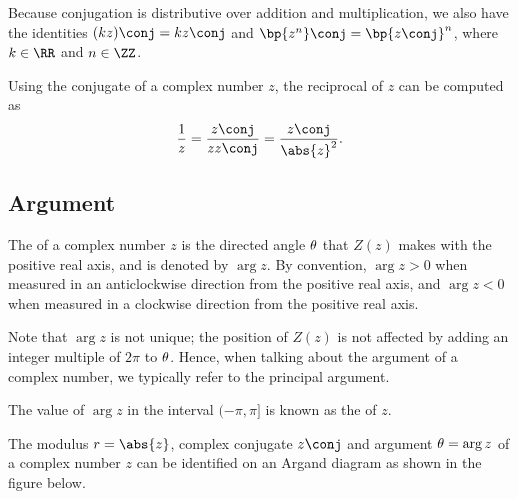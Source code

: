 Because conjugation is distributive over addition and multiplication, we also have the identities $(kz)\conj = k z\conj$ and $\bp{z^n}\conj = \bp{z\conj}^n$, where $k \in \RR$ and $n \in \ZZ$.

Using the conjugate of a complex number $z$, the reciprocal of $z$ can be computed as \[\frac1{z} = \frac{z\conj}{z z\conj} = \frac{z \conj}{\abs{z}^2}.\]

\subsection{Argument}

\begin{definition}
    The  of a complex number $z$ is the directed angle $\theta$ that $Z(z)$ makes with the positive real axis, and is denoted by $\arg{z}$. By convention, $\arg{z} > 0$ when measured in an anticlockwise direction from the positive real axis, and $\arg{z} < 0$ when measured in a clockwise direction from the positive real axis.
\end{definition}

Note that $\arg{z}$ is not unique; the position of $Z(z)$ is not affected by adding an integer multiple of $2\pi$ to $\theta$. Hence, when talking about the argument of a complex number, we typically refer to the principal argument.

\begin{definition}
    The value of $\arg{z}$ in the interval $(-\pi, \pi]$ is known as the  of $z$.
\end{definition}

The modulus $r = \abs{z}$, complex conjugate $z\conj$ and argument $\theta = \arg{z}$ of a complex number $z$ can be identified on an Argand diagram as shown in the figure below.

